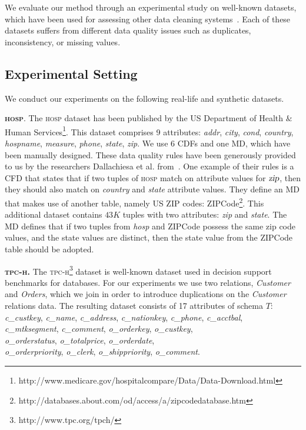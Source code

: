 We evaluate our method through an experimental study on well-known datasets, which have been used for assessing other data cleaning systems~\cite{Dallachiesa:2013:NCD:2463676.2465327, chu2013holistic, llunaticVDLB2013b, bohannon2005cost}. Each of these datasets suffers from different data quality issues such as duplicates, inconsistency, or missing values. 

\subsection{Experimental Setting} 
We conduct our experiments on the following real-life and synthetic datasets.


\textbf{\textsc{hosp}}. The \textsc{hosp} dataset has been published by the US Department of Health $\&$ Human Services\footnote{http://www.medicare.gov/hospitalcompare/Data/Data-Download.html}. This dataset comprises 9 attributes: \textsl{addr}, \textsl{city}, \textsl{cond}, \textsl{country}, \textsl{hospname}, \textsl{measure}, \textsl{phone}, \textsl{state}, \textsl{zip}. 
We use 6 CDFs and one MD, which have been manually designed. These data quality rules have been generously provided to us by the researchers Dallachiesa et al. from~\cite{Dallachiesa:2013:NCD:2463676.2465327}. One example of their rules is a CFD that states that if two tuples of \textsc{hosp} match on attribute values for $\textsl{zip}$, then they should also match on \textsl{country} and \textsl{state} attribute values. They define an MD that makes use of another table, namely US ZIP codes: ZIPCode\footnote{http://databases.about.com/od/access/a/zipcodedatabase.htm}. This additional dataset contains $43K$ tuples with two attributes: \textsl{zip} and \textsl{state}. The MD defines that if two tuples from \textsl{hosp} and ZIPCode possess the same zip code values, and the state values are distinct, then the state value from the ZIPCode table should be adopted. 

\textbf{\textsc{tpc-h}.} The \textsc{tpc-h}\footnote{http://www.tpc.org/tpch/} dataset is well-known dataset used in decision support benchmarks for databases. For our experiments we use two relations, \textit{Customer} and \textit{Orders}, which we join in order to introduce duplications on the \textit{Customer} relations data. The resulting dataset consists of 17 attributes of schema $T$: \textsl{c\_custkey}, \textsl{c\_name}, \textsl{c\_address},  \textsl{c\_nationkey}, \textsl{c\_phone}, \textsl{c\_acctbal},\\ \textsl{c\_mtksegment}, \textsl{c\_comment}, \textsl{o\_orderkey}, \textsl{o\_custkey},\\ \textsl{o\_orderstatus}, \textsl{o\_totalprice}, \textsl{o\_orderdate},\\ \textsl{o\_orderpriority}, \textsl{o\_clerk}, \textsl{o\_shippriority}, \textsl{o\_comment}. 

